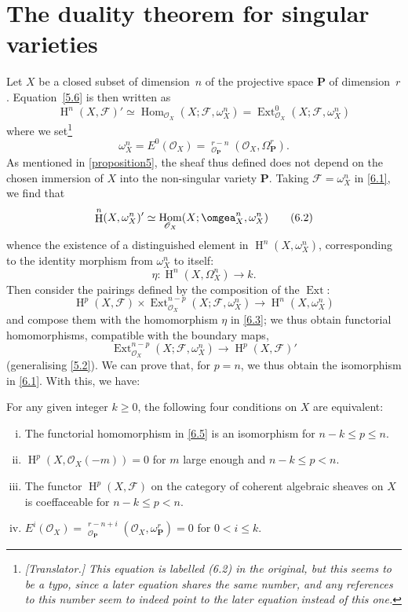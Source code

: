 \documentclass{article}
\theoremstyle{plain}
\newenvironment{theorem}[1]
    {\renewcommand\theinnercustomtheorem{#1}\innercustomtheorem}
    {\endinnercustomtheorem}
\theoremstyle{definition}
\newcommand{\sh}{\mathscr}
\newcommand{\bb}{\mathbf}
\renewcommand{\geq}{\geqslant}
\renewcommand{\leq}{\leqslant}
\DeclareMathOperator{\Ext}{Ext}
\DeclareMathOperator{\Hom}{Hom}
\DeclareMathOperator{\shExt}{\underline{Ext}}
\DeclareMathOperator{\HH}{H}
\newcommand{\oldpage}[1]{\marginpar{\footnotesize$\Big\vert$ \textit{p.~#1}}}
\begin{document}
\section{The duality theorem for singular varieties}
\label{section6}

Let $X$ be a closed subset of dimension~$n$ of the projective space $\bb{P}$ of dimension~$r$.
Equation~\cref{5.6} is then written as
\[
\label{6.1}
  \HH^n(X,\sh{F})'
  \simeq \Hom_{\sh{O}_X}(X;\sh{F},\omega_X^n)
  = \Ext_{\sh{O}_X}^0(X;\sh{F},\omega_X^n)
\tag{6.1}
\]
where we set\footnote{\emph{[Translator.] This equation is labelled (6.2) in the original, but this seems to be a typo, since a later equation shares the same number, and any references to this number seem to indeed point to the later equation instead of this one.}}
\[
  \omega_X^n = E^0(\sh{O}_X) = \shExt_{\sh{O}_\bb{P}}^{r-n}(\sh{O}_X,\Omega_\bb{P}^r).
\]
As mentioned in \cref{proposition5}, the sheaf thus defined does not depend on the chosen immersion of $X$ into the non-singular variety $\bb{P}$.
Taking $\sh{F}=\omega_X^n$ in \cref{6.1}, we find that
\[
\label{6.2}
  \HH^n(X,\omega_X^n)' \simeq \Hom_{\sh{O}_X}(X;\omgea_X^n,\omega_X^n)
\tag{6.2}
\]
whence the existence of a distinguished element in $\HH^n(X,\omega_X^n)$, corresponding to the identity morphism from $\omega_X^n$ to itself:
\[
\label{6.3}
  \eta\colon \HH^n(X,\Omega_X^n) \to k.
\tag{6.3}
\]
\oldpage{149-18}
Then consider the pairings defined by the composition of the $\Ext$:
\[
\label{6.4}
  \HH^p(X,\sh{F}) \times \Ext_{\sh{O}_X}^{n-p}(X;\sh{F},\omega_X^n)
  \to \HH^n(X,\omega_X^n)
\tag{6.4}
\]
and compose them with the homomorphism $\eta$ in \cref{6.3}; we thus obtain functorial homomorphisms, compatible with the boundary maps,
\[
\label{6.5}
  \Ext_{\sh{O}_X}^{n-p}(X;\sh{F},\omega_X^n) \to \HH^p(X,\sh{F})'
\tag{6.5}
\]
(generalising \cref{5.2}).
We can prove that, for $p=n$, we thus obtain the isomorphism in \cref{6.1}.
With this, we have:

\begin{theorem}{3~bis}
\label{theorem3bis}
  For any given integer $k\geq0$, the following four conditions on $X$ are equivalent:
  \begin{enumerate}[i.]
    \item The functorial homomorphism in \cref{6.5} is an isomorphism for $n-k\leq p\leq n$.
    \item $\HH^p(X,\sh{O}_X(-m)) = 0$ for $m$ large enough and $n-k\leq p<n$.
    \item The functor $\HH^p(X,\sh{F})$ on the category of coherent algebraic sheaves on $X$ is coeffaceable for $n-k\leq p<n$.
    \item $E^i(\sh{O}_X) = \shExt_{\sh{O}_\bb{P}}^{r-n+i}(\sh{O}_X,\omega_\bb{P}^r) = 0$ for $0<i\leq k$.
  \end{enumerate}
\end{theorem}
\end{document}

